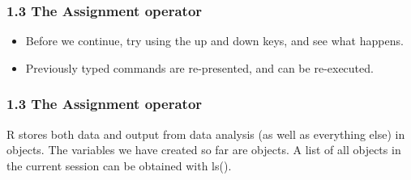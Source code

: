 \documentclass{beamer}
\begin{document}
	\begin{frame}[fragile]
		\frametitle{1.3 The Assignment operator}
		\begin{itemize}
		\item	Before we continue, try using the up and down keys, and see what happens. 
		\item Previously
			typed commands are re-presented, and can be re-executed.
		\end{itemize}
	
	\end{frame}
	\begin{frame}[fragile]
		\frametitle{1.3 The Assignment operator }
		R stores both data and output from data analysis (as well as everything else) in objects.
		The variables we have created so far are objects. A list of all objects in the current session can
		be obtained with ls().
	\end{frame}
	
\end{document}
